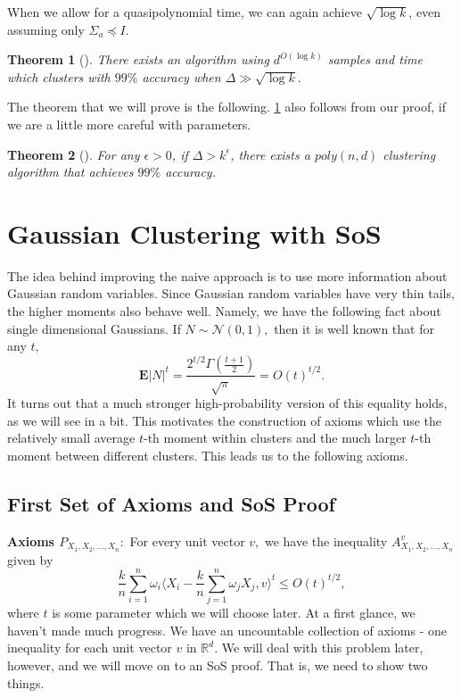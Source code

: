 \documentclass[12pt]{article}%
\newtheorem{theorem}{Theorem}
\newcommand{\expect}{\mathbf{E}}
\begin{document}
\noindent
When we allow for a quasipolynomial time, we can again achieve $\sqrt{\log k}$, even assuming only $\Sigma_a \preceq I$.

\begin{theorem}[\cite{Kothari2018RobustME,HopkinsLi,diakonikolas2018list}]
\label{thm:quasi}
There exists an algorithm using $d^{O(\log k)}$ samples and time which clusters with $99\%$ accuracy when $\Delta \gg \sqrt{\log k}.$
\end{theorem}

\noindent
The theorem that we will prove is the following. \cref{thm:quasi} also follows from our proof, if we are a little more careful with parameters.

\begin{theorem}[\cite{Kothari2018RobustME,HopkinsLi,diakonikolas2018list}]
For any $\epsilon > 0$, if $\Delta >k^\epsilon$, there exists a $poly(n,d)$ clustering algorithm that achieves $99\%$ accuracy.
\end{theorem}



\section{Gaussian Clustering with SoS}
The idea behind improving the naive approach is to use more information about Gaussian random variables. Since Gaussian random variables have very thin tails, the higher moments also behave well. Namely, we have the following fact about single dimensional Gaussians. If $N \sim \mathcal{N}(0,1),$ then it is well known that for any $t,$
$$
\expect |N|^t = \frac{2^{t/2}\Gamma(\frac{t+1}{2})}{\sqrt{\pi}} = O(t)^{t/2}.
$$
It turns out that a much stronger high-probability version of this equality holds, as we will see in a bit. This motivates the construction of axioms which use the relatively small average $t$-th moment within clusters and the much larger $t$-th moment between different clusters. This leads us to the following axioms.

\subsection{First Set of Axioms and SoS Proof}

\noindent
\textbf{Axioms $P_{X_1,X_2, \ldots, X_n}:$ }
For every unit vector $v,$ we have the inequality $A^v_{X_1, X_2, \ldots, X_n}$ given by
$$
\frac{k}{n}
\sum^n_{i=1} \omega_i 
\langle X_i - \frac{k}{n}\sum_{j = 1}^n \omega_j X_j, 
v\rangle ^t \le 
O(t)^{t/2},
$$
where $t$ is some parameter which we will choose later.
At a first glance, we haven't made much progress. 
We have an uncountable collection of axioms - one inequality for each unit vector $v$ in $\mathbb{R}^d.$ We will deal with this problem later, however, and we will move on to an SoS proof. That is, we need to show two things.\\
\end{document}

